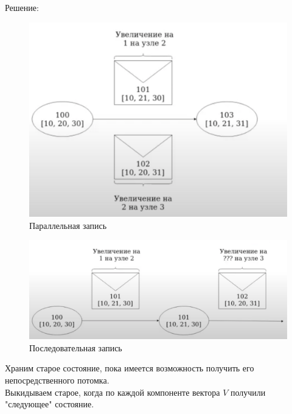       Решение:\\
      \begin{figure}[h]
          \centering
          \includegraphics[scale = 0.5]{../assets/15.png}
          \caption{Параллельная запись}
      \end{figure}
      \begin{figure}[h]
          \centering
          \includegraphics[scale = 0.5]{../assets/16.png}
          \caption{Последовательная запись}
      \end{figure}
      Храним старое состояние, пока имеется возможность получить его непосредственного потомка.\\
      Выкидываем старое, когда по каждой компоненте вектора $V$ получили "следующее" состояние.
